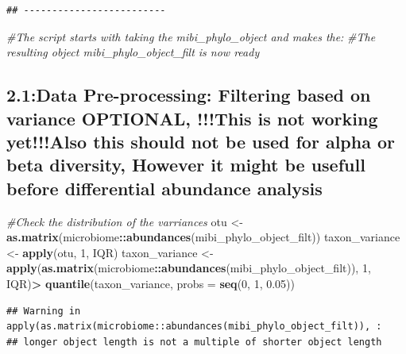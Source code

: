 \documentclass[
]{article}
\newenvironment{Shaded}{\begin{snugshade}}{\end{snugshade}}
\newcommand{\AttributeTok}[1]{\textcolor[rgb]{0.13,0.29,0.53}{#1}}
\newcommand{\CommentTok}[1]{\textcolor[rgb]{0.56,0.35,0.01}{\textit{#1}}}
\newcommand{\DecValTok}[1]{\textcolor[rgb]{0.00,0.00,0.81}{#1}}
\newcommand{\FloatTok}[1]{\textcolor[rgb]{0.00,0.00,0.81}{#1}}
\newcommand{\FunctionTok}[1]{\textcolor[rgb]{0.13,0.29,0.53}{\textbf{#1}}}
\newcommand{\NormalTok}[1]{#1}
\newcommand{\OtherTok}[1]{\textcolor[rgb]{0.56,0.35,0.01}{#1}}
\newcommand{\SpecialCharTok}[1]{\textcolor[rgb]{0.81,0.36,0.00}{\textbf{#1}}}
\begin{document}
\begin{verbatim}
## -------------------------
\end{verbatim}

\begin{Shaded}
\begin{Highlighting}[]
\CommentTok{\#The script starts with taking the mibi\_phylo\_object and makes the: }
\CommentTok{\#The resulting object \textquotesingle{}mibi\_phylo\_object\_filt\textquotesingle{} is now ready }
\end{Highlighting}
\end{Shaded}

\subsection{2.1:Data Pre-processing: Filtering based on variance
OPTIONAL, !!!This is not working yet!!!Also this should not be used for
alpha or beta diversity, However it might be usefull before differential
abundance
analysis}\label{data-pre-processing-filtering-based-on-variance-optional-this-is-not-working-yetalso-this-should-not-be-used-for-alpha-or-beta-diversity-however-it-might-be-usefull-before-differential-abundance-analysis}

\begin{Shaded}
\begin{Highlighting}[]
\CommentTok{\#Check the distribution of the varriances }
\NormalTok{otu }\OtherTok{\textless{}{-}} \FunctionTok{as.matrix}\NormalTok{(microbiome}\SpecialCharTok{::}\FunctionTok{abundances}\NormalTok{(mibi\_phylo\_object\_filt))}
\NormalTok{taxon\_variance }\OtherTok{\textless{}{-}} \FunctionTok{apply}\NormalTok{(otu, }\DecValTok{1}\NormalTok{, IQR)}
\NormalTok{taxon\_variance }\OtherTok{\textless{}{-}} \FunctionTok{apply}\NormalTok{(}\FunctionTok{as.matrix}\NormalTok{(microbiome}\SpecialCharTok{::}\FunctionTok{abundances}\NormalTok{(mibi\_phylo\_object\_filt)), }\DecValTok{1}\NormalTok{, IQR)}\SpecialCharTok{\textgreater{}} \FunctionTok{quantile}\NormalTok{(taxon\_variance, }\AttributeTok{probs =} \FunctionTok{seq}\NormalTok{(}\DecValTok{0}\NormalTok{, }\DecValTok{1}\NormalTok{, }\FloatTok{0.05}\NormalTok{))}
\end{Highlighting}
\end{Shaded}

\begin{verbatim}
## Warning in apply(as.matrix(microbiome::abundances(mibi_phylo_object_filt)), :
## longer object length is not a multiple of shorter object length
\end{verbatim}
\end{document}
